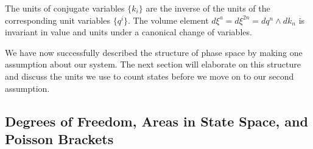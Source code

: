 \documentclass{article}
\begin{document}
	
	
	
\begin{prop}
	The units of conjugate variables $\{k_i\}$ are the inverse of the units of the corresponding unit variables $\{q^i\}$. The volume element $d\xi^a = d\xi^{2n} = dq^n \land dk_n$ is invariant in value and units under a canonical change of variables.
\end{prop}

We have now successfully described the structure of phase space by making one assumption about our system. The next section will elaborate on this structure and discuss the units we use to count states before we move on to our second assumption.

\subsection{Degrees of Freedom, Areas in State Space, and Poisson Brackets}
\end{document}
